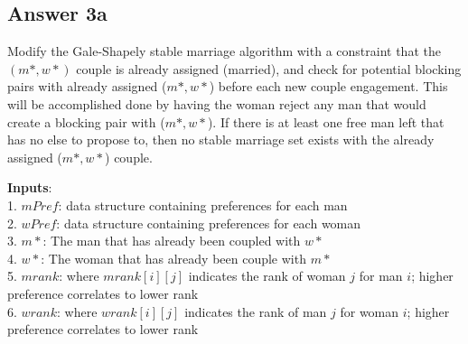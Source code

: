 \documentclass[twoside]{article}
\begin{document}
\subsection{Answer 3a}

Modify the Gale-Shapely stable marriage algorithm with a constraint that the $(m*,w*)$ couple is already assigned (married), and check for potential blocking pairs with already assigned ($m*, w*$) before each new couple engagement. This will be accomplished done by having the woman reject any man that would create a blocking pair with ($m*, w*$).  If there is at least one free man left that has no else to propose to, then no stable marriage set exists with the already assigned ($m*, w*$) couple. 

\textbf{Inputs}:\\
1. $mPref$: data structure containing preferences for each man \\
2. $wPref$: data structure containing preferences for each woman \\
3. $m*$: The man that has already been coupled with $w*$ \\
4. $w*$: The woman that has already been couple with $m*$ \\
5. $mrank$: where $mrank[i][j]$ indicates the rank of woman $j$ for man $i$; higher preference correlates to lower rank \\
6. $wrank$: where $wrank[i][j]$ indicates the rank of man $j$ for woman $i$; higher preference correlates to lower rank \\
\end{document}
